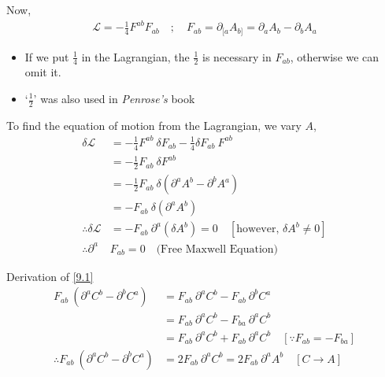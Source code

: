 \documentclass[14pt]{article} %
\begin{document}
Now, 
\begin{align*}
\mathcal{L} = -\frac{1}{4} F^{ab} F_{ab} \quad;\quad F_{ab} = \partial_{[a}A_{b]} = \partial_a A_b - \partial_b A_a
\end{align*}
\begin{tcolorbox}[ proofbox, title=Note about the factor-$\frac{1}{2}$ ]
\begin{itemize}
    \item If we put $\frac{1}{4}$ in the Lagrangian, the $\frac{1}{2}$ is necessary in $F_{ab}$, otherwise we can omit it.
    \item `$\frac{1}{2}$' was also used in \textit{Penrose's} book
\end{itemize}
\end{tcolorbox}
To find the equation of motion from the Lagrangian, we vary $A$,
\begin{align*}
\delta \mathcal{L} &= -\frac{1}{4} F^{ab}~\delta F_{ab}  -\frac{1}{4} \delta F_{ab}~ F^{ab} \\
&= -\frac{1}{2} F_{ab}~ \delta F^{ab} \\
&= -\frac{1}{2} F_{ab}~\delta ( \partial^a A^b - \partial^b A^a ) \\
&= -F_{ab}~ \delta (\partial^a A^b) \tag{9.1} \label{9.1} \\
\therefore \delta \mathcal{L}&= -F_{ab}~ \partial^a (\delta A^b) =0 \quad [\text{however, } \delta A^b \ne 0] \\
\therefore \partial^a &F_{ab} = 0 \quad \text{(Free Maxwell Equation)}
\end{align*}
\begin{tcolorbox}
Derivation of \eqref{9.1}
\begin{align}
F_{ab}~(\partial^a C^b - \partial^b C^a ) &= F_{ab}~\partial^a C^b - F_{ab}~\partial^b C^a  \\
&= F_{ab}~\partial^a C^b - F_{ba}~\partial^a C^b \\
&= F_{ab}~\partial^a C^b + F_{ab}~\partial^a C^b \quad [\because F_{ab} = -F_{ba} ] \\
\therefore F_{ab}~(\partial^a C^b - \partial^b C^a ) &= 2F_{ab}~\partial^a C^b = 2F_{ab}~\partial^a A^b \quad[ C\to A ]
\end{align}
\end{tcolorbox}
\end{document}
